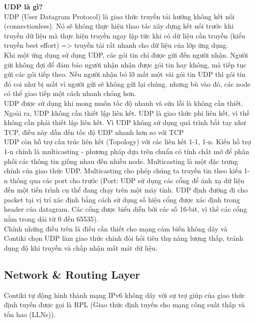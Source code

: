 \documentclass{report}
\begin{document}
\textbf{UDP là gì?} \\

UDP (User Datagram Protocol) là giao thức truyền tải hướng không kết nối (connectionless). Nó sẽ không thực hiện thao tác xây dựng kết nối trước khi truyền dữ liệu mà thực hiện truyền ngay lập tức khi có dữ liệu cần truyền (kiểu truyền best effort) => truyền tải rất nhanh cho dữ liệu của lớp ứng dụng. \\

Khi một ứng dụng sử dụng UDP, các gói tin chỉ được gửi đến người nhận. Người gửi không đợi để đảm bảo người nhận nhận được gói tin hay không, mà tiếp tục gửi các gói tiếp theo. Nếu người nhận bỏ lỡ mất một vài gói tin UDP thì gói tin đó coi như bị mất vì người gửi sẽ không gửi lại chúng. nhưng bù vào đó, các node có thể giao tiếp một cách nhanh chóng hơn. \\

UDP được sử dụng khi mong muốn tốc độ nhanh và sửa lỗi là không cần thiết. Ngoài ra, UDP
không cần thiết lập liên kết. UDP là giao thức phi liên kết, vì thế không cần phải thiết lập liên
kết. Vì UDP không sử dụng quá trình bắt tay như TCP, điều này dẫn đến tốc độ UDP nhanh
hơn so với TCP \\

UDP còn hỗ trợ cấu trúc liên kết (Topology) với các liên kết 1-1, 1-n. Kiểu hồ trợ 1-n chính là
multicasting - phương pháp dựa trên chuẩn có tính chất mở để phân phối các thông tin giống
nhau đến nhiều node. Multicasting là một đặc trưng chính của giao thức UDP. Multicasting
cho phép chúng ta truyền tin theo kiểu 1-n thông qua các port cho trước (Port: UDP sử dụng
các cổng để ánh xạ dữ liệu đến một tiến trình cụ thể đang chạy trên một máy tính. UDP
định đường đi cho packet tại vị trí xác định bằng cách sử dụng số hiệu cổng được xác định
trong header của datagram. Các cổng được biểu diễn bởi các số 16-bit, vì thế các cổng nằm
trong dải từ 0 đến 65535). \\

Chính những điều trên là điều cần thiết cho mạng cảm biến không dây và Contiki chọn
UDP làm giao thức chính đòi hỏi tiêu thụ năng lượng thấp, tránh dụng độ khi
truyền và chấp nhận mất mát dữ liệu.
\subsection{Network \& Routing Layer}
Contiki tự động hình thành mạng IPv6 không dây với sự trợ giúp của giao thức định tuyến được gọi là RPL (Giao thức định tuyến cho mạng công suất thấp và tổn hao (LLNs)). 
\end{document}
